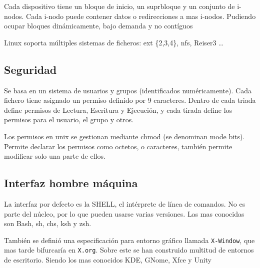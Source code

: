     Cada dispositivo tiene un bloque de inicio, un suprbloque y un conjunto de i-nodos. Cada i-nodo puede contener datos o redirecciones a mas i-nodos. Pudiendo ocupar bloques dinámicamente, bajo demanda y no contíguos

    Linux soporta múltiples sistemas de ficheros: ext \{2,3,4\}, nfs, Reiser3 \dots

\subsection{Seguridad}
    Se basa en un sistema de usuarios y grupos (identificados numéricamente). Cada fichero tiene asignado un permiso definido por 9 caracteres. Dentro de cada triada define permisos de Lectura, Escritura y Ejecución, y cada tirada define los permisos para el usuario, el grupo y otros.

    Los permisos en unix se gestionan mediante chmod (se denominan mode bits). Permite declarar los permisos como octetos, o caracteres, también permite modificar solo una parte de ellos.

\subsection{Interfaz hombre máquina}
    La interfaz por defecto es la SHELL, el intérprete de línea de comandos. No es parte del núcleo, por lo que pueden usarse varias versiones. Las mas conocidas son Bash, sh, chs, ksh y zsh.

    También se definió una especificación para entorno gráfico llamada \texttt{X-Window}, que mas tarde bifurcaría en \texttt{X.org}. Sobre este se han construido multitud de entornos de escritorio. Siendo los mas conocidos KDE, GNome, Xfce y Unity
